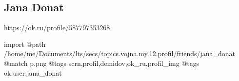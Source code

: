  
 
 
 
 

\subsection{Jana Donat}

\url{https://ok.ru/profile/587797353268}

\ifcmt
 import
 @path /home/me/Documents/lts/secs/topics.vojna.my.12.profil/friends/jana_donat
 @match p.png
 @tags scrn,profil,demidov,ok_ru,profil_img
 @tags ok.user.jana_donat
\fi
{}
